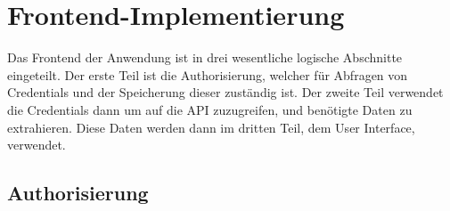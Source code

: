 \section{Frontend-Implementierung}
Das Frontend der Anwendung ist in drei wesentliche logische Abschnitte eingeteilt. Der erste Teil ist die Authorisierung, welcher für Abfragen von 
Credentials und der Speicherung dieser zuständig ist. Der zweite Teil verwendet die Credentials dann um auf die API zuzugreifen, und benötigte 
Daten zu extrahieren. Diese Daten werden dann im dritten Teil, dem User Interface, verwendet. 
\subsection{Authorisierung}

